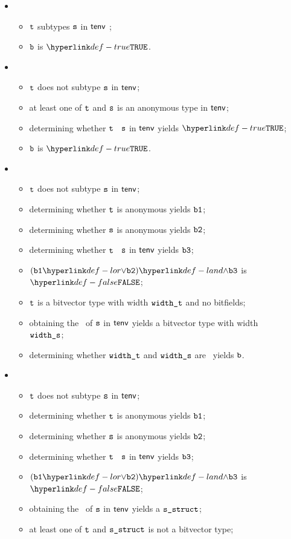 \ProseParagraph
\OneApplies
 \begin{itemize}
  \item {}
    \begin{itemize}
    \item $\texttt{t}$ subtypes $\texttt{s}$ in $\textsf{tenv}$ ;
    \item $\texttt{b}$ is $\True$.
  \end{itemize}

  \item {}
  \begin{itemize}
    \item $\texttt{t}$ does not subtype $\texttt{s}$ in $\textsf{tenv}$;
    \item at least one of $\texttt{t}$ and $\texttt{s}$ is an anonymous type in $\textsf{tenv}$;
    \item determining whether $\texttt{t}$ \subtypesatisfies\ $\texttt{s}$ in $\textsf{tenv}$ yields $\True$\ProseOrTypeError;
    \item $\texttt{b}$ is $\True$.
  \end{itemize}

  \item {}
  \begin{itemize}
    \item $\texttt{t}$ does not subtype $\texttt{s}$ in $\textsf{tenv}$;
    \item determining whether $\texttt{t}$ is anonymous yields $\texttt{b1}$;
    \item determining whether $\texttt{s}$ is anonymous yields $\texttt{b2}$;
    \item determining whether $\texttt{t}$ \subtypesatisfies\ $\texttt{s}$ in $\textsf{tenv}$ yields $\texttt{b3}$;
    \item $(\vbone \lor \vbtwo) \land \vbthree$ is $\False$;
    \item $\texttt{t}$ is a bitvector type with width $\texttt{width\_t}$ and no bitfields;
    \item obtaining the \structure\ of $\texttt{s}$ in $\textsf{tenv}$ yields a bitvector type with width \\
          $\texttt{width\_s}$\ProseOrTypeError;
    \item determining whether $\texttt{width\_t}$ and $\texttt{width\_s}$ are \bitwidthequivalent\ yields $\texttt{b}$.
  \end{itemize}

  \item {}
  \begin{itemize}
    \item $\texttt{t}$ does not subtype $\texttt{s}$ in $\textsf{tenv}$;
    \item determining whether $\texttt{t}$ is anonymous yields $\texttt{b1}$;
    \item determining whether $\texttt{s}$ is anonymous yields $\texttt{b2}$;
    \item determining whether $\texttt{t}$ \subtypesatisfies\ $\texttt{s}$ in $\textsf{tenv}$ yields $\texttt{b3}$;
    \item $(\vbone \lor \vbtwo) \land \vbthree$ is $\False$;
    \item obtaining the \structure\ of $\texttt{s}$ in $\textsf{tenv}$ yields a $\texttt{s\_struct}$\ProseOrTypeError;
    \item at least one of $\texttt{t}$ and $\texttt{s\_struct}$ is not a bitvector type;
  \end{itemize}


\end{itemize}
